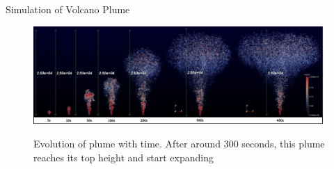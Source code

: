 \documentclass[final]{beamer}
\newlength{\onecolwid}
\newlength{\twocolwid}
\begin{document}
\begin{frame}[t]
\begin{columns}[t]
\begin{column}{\twocolwid}
\begin{columns}[t,totalwidth=\twocolwid]
\begin{column}{\onecolwid}




\end{column} %

\end{columns} \vspace{-1.0in}

\begin{block}{Simulation of Volcano Plume}

\begin{figure}
\centering
{\includegraphics[scale=0.90]{plume_grow_up}}
\caption{Evolution of plume with time. After around 300 seconds, this plume reaches its top height and start expanding}
\end{figure}

\end{block}\vspace{-1.8in}

\begin{columns}[t,totalwidth=\twocolwid] \vspace{-1.5in}%

\begin{column}{\onecolwid} %


\end{column}
\end{columns}
\end{column}
\end{columns}
\end{frame}
\end{document}
